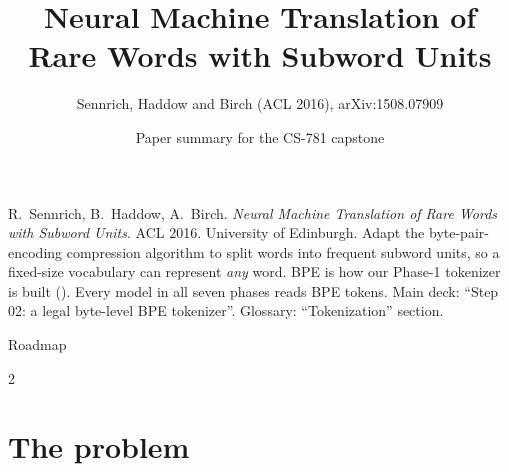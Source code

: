 \documentclass[aspectratio=169,11pt]{beamer}
\title[Subword Units (BPE)]{Neural Machine Translation of Rare Words with Subword Units}
\subtitle{Sennrich, Haddow and Birch (ACL 2016), arXiv:1508.07909}
\author[Paper summary]{Paper summary for the CS-781 capstone}
\date{}
\begin{document}
\begin{frame}\titlepage\end{frame}

\paperglance
{R.\ Sennrich, B.\ Haddow, A.\ Birch. \emph{Neural Machine Translation of Rare Words with Subword Units}. ACL 2016. University of Edinburgh.}
{Adapt the byte-pair-encoding compression algorithm to split words into frequent subword units, so a fixed-size vocabulary can represent \emph{any} word.}
{BPE is how our Phase-1 tokenizer is built (). Every model in all seven phases reads BPE tokens.}
{Main deck: ``Step 02: a legal byte-level BPE tokenizer''. Glossary: ``Tokenization'' section.}

\begin{frame}{Roadmap}
  \begin{multicols}{2}\small\tableofcontents\end{multicols}
\end{frame}

\section{The problem}
\end{document}
